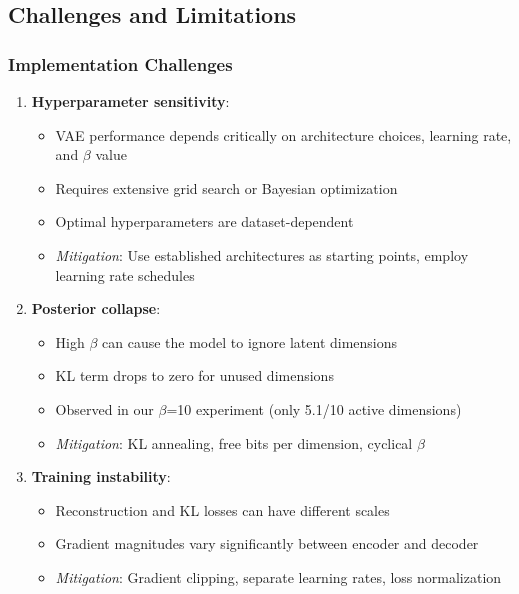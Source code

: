 \documentclass[conference]{IEEEtran}
\begin{document}
\subsection{Challenges and Limitations}

\subsubsection{Implementation Challenges}

\begin{enumerate}
    \item \textbf{Hyperparameter sensitivity}: 
    \begin{itemize}
        \item VAE performance depends critically on architecture choices, learning rate, and $\beta$ value
        \item Requires extensive grid search or Bayesian optimization
        \item Optimal hyperparameters are dataset-dependent
        \item \textit{Mitigation}: Use established architectures as starting points, employ learning rate schedules
    \end{itemize}
    
    \item \textbf{Posterior collapse}: 
    \begin{itemize}
        \item High $\beta$ can cause the model to ignore latent dimensions
        \item KL term drops to zero for unused dimensions
        \item Observed in our $\beta$=10 experiment (only 5.1/10 active dimensions)
        \item \textit{Mitigation}: KL annealing, free bits per dimension, cyclical $\beta$
    \end{itemize}
    
    \item \textbf{Training instability}:
    \begin{itemize}
        \item Reconstruction and KL losses can have different scales
        \item Gradient magnitudes vary significantly between encoder and decoder
        \item \textit{Mitigation}: Gradient clipping, separate learning rates, loss normalization
    \end{itemize}
    

\end{enumerate}
\end{document}
